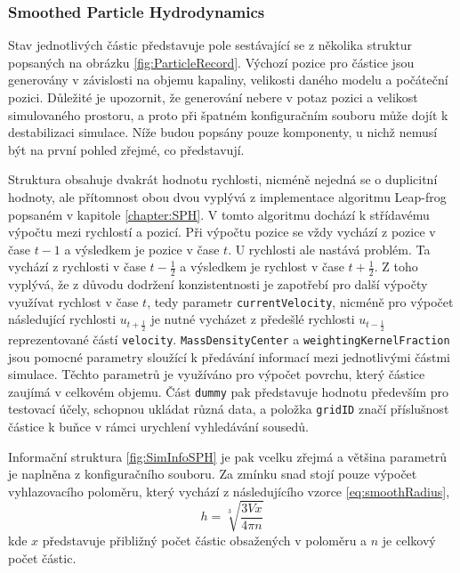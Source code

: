 \subsubsection{Smoothed Particle Hydrodynamics}
Stav jednotlivých částic představuje pole sestávající se z několika struktur popsaných na obrázku \ref{fig:ParticleRecord}. Výchozí pozice pro částice jsou generovány v závislosti na objemu kapaliny, velikosti daného modelu a počáteční pozici. Důležité je upozornit, že generování nebere v potaz pozici a velikost simulovaného prostoru, a proto při špatném konfiguračním souboru může dojít k destabilizaci simulace. Níže budou popsány pouze komponenty, u nichž nemusí být na první pohled zřejmé, co představují. 

Struktura obsahuje dvakrát hodnotu rychlosti, nicméně nejedná se o duplicitní hodnoty, ale přítomnost obou dvou vyplývá z implementace algoritmu Leap-frog popsaném v kapitole \ref{chapter:SPH}. V tomto algoritmu dochází k střídavému výpočtu mezi rychlostí a pozicí. Při výpočtu pozice se vždy vychází z pozice v čase $t-1$ a výsledkem je pozice v čase $t$. U rychlosti ale nastává problém. Ta vychází z rychlosti v čase $t-\frac{1}{2}$ a výsledkem je rychlost v čase $t+\frac{1}{2}$. Z toho vyplývá, že z důvodu dodržení konzistentnosti je zapotřebí pro další výpočty využívat rychlost v čase $t$, tedy parametr \texttt{currentVelocity}, nicméně pro výpočet následující rychlosti $u_{t+\frac{1}{2}}$ je nutné vycházet z předešlé rychlosti $u_{t-\frac{1}{2}}$ reprezentované částí \texttt{velocity}. \texttt{MassDensityCenter} a \texttt{weightingKernelFraction} jsou pomocné parametry sloužící k předávání informací mezi jednotlivými částmi simulace. Těchto parametrů je využíváno pro výpočet povrchu, který částice zaujímá v celkovém objemu. Část \texttt{dummy} pak představuje hodnotu především pro testovací účely, schopnou ukládat různá data, a položka \texttt{gridID} značí příslušnost částice k buňce v rámci urychlení vyhledávání sousedů.

Informační struktura \ref{fig:SimInfoSPH} je pak vcelku zřejmá a většina parametrů je naplněna z konfiguračního souboru. Za zmínku snad stojí pouze výpočet vyhlazovacího poloměru, který vychází z následujícího vzorce \ref{eq:smoothRadius},
\begin{equation}
    h=\sqrt[3]{\frac{3 V x}{4 \pi n}}
    \label{eq:smoothRadius}
\end{equation}
kde $x$ představuje přibližný počet částic obsažených v poloměru a $n$ je celkový počet částic.

